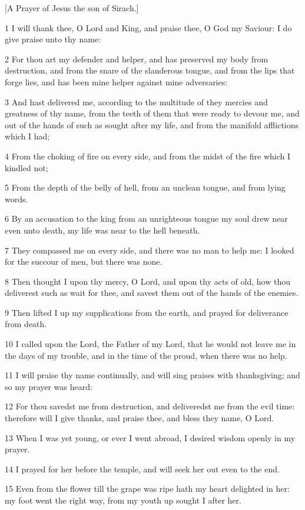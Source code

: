 [A Prayer of Jesus the son of Sirach.]\par 1 I will thank thee, O Lord and King, and praise thee, O God my Saviour: I do give praise unto thy name:
\par 2 For thou art my defender and helper, and has preserved my body from destruction, and from the snare of the slanderous tongue, and from the lips that forge lies, and has been mine helper against mine adversaries:
\par 3 And hast delivered me, according to the multitude of they mercies and greatness of thy name, from the teeth of them that were ready to devour me, and out of the hands of such as sought after my life, and from the manifold afflictions which I had;
\par 4 From the choking of fire on every side, and from the midst of the fire which I kindled not;
\par 5 From the depth of the belly of hell, from an unclean tongue, and from lying words.
\par 6 By an accusation to the king from an unrighteous tongue my soul drew near even unto death, my life was near to the hell beneath.
\par 7 They compassed me on every side, and there was no man to help me: I looked for the succour of men, but there was none.
\par 8 Then thought I upon thy mercy, O Lord, and upon thy acts of old, how thou deliverest such as wait for thee, and savest them out of the hands of the enemies.
\par 9 Then lifted I up my supplications from the earth, and prayed for deliverance from death.
\par 10 I called upon the Lord, the Father of my Lord, that he would not leave me in the days of my trouble, and in the time of the proud, when there was no help.
\par 11 I will praise thy name continually, and will sing praises with thanksgiving; and so my prayer was heard:
\par 12 For thou savedst me from destruction, and deliveredst me from the evil time: therefore will I give thanks, and praise thee, and bless they name, O Lord.
\par 13 When I was yet young, or ever I went abroad, I desired wisdom openly in my prayer.
\par 14 I prayed for her before the temple, and will seek her out even to the end.
\par 15 Even from the flower till the grape was ripe hath my heart delighted in her: my foot went the right way, from my youth up sought I after her.
